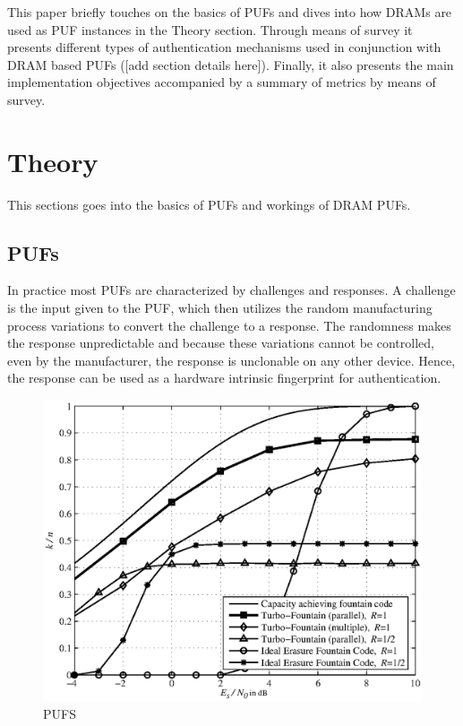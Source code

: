 \documentclass[journal, a4paper]{IEEEtran}
\begin{document}
This paper briefly touches on the basics of PUFs and dives into how DRAMs are used as PUF instances in the Theory section. Through means of survey it presents different types of authentication mechanisms used in conjunction with DRAM based PUFs ([add section details here]). Finally, it also presents the main implementation objectives accompanied by a summary of metrics by means of survey.

\section{Theory}
This sections goes into the basics of PUFs and workings of DRAM PUFs.

\subsection{PUFs}
In practice most PUFs are characterized by challenges and responses. A challenge is the input given to the PUF, which then utilizes the random manufacturing process variations to convert the challenge to a response. The randomness makes the response unpredictable and because these variations cannot be controlled, even by the manufacturer, the response is unclonable on any other device. Hence, the response can be used as a hardware intrinsic fingerprint for authentication.

\begin{figure}[!hbt]
    \begin{center}
    \includegraphics[width=\columnwidth]{figs/plot_tf.eps}
    \caption{PUFS}
    \label{fig:tf_plot}
    \end{center}
\end{figure}
\end{document}
